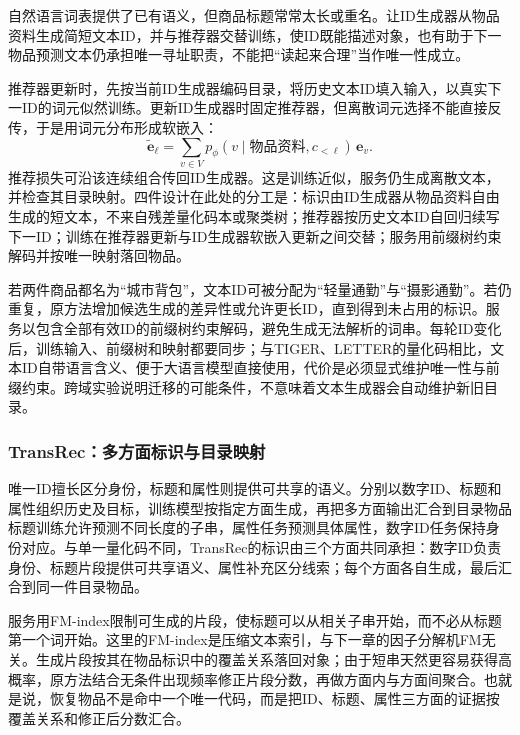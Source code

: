 自然语言词表提供了已有语义，但商品标题常常太长或重名。让ID生成器从物品资料生成简短文本ID，并与推荐器交替训练，使ID既能描述对象，也有助于下一物品预测文本仍承担唯一寻址职责，不能把“读起来合理”当作唯一性成立。

推荐器更新时，先按当前ID生成器编码目录，将历史文本ID填入输入，以真实下一ID的词元似然训练。更新ID生成器时固定推荐器，但离散词元选择不能直接反传，于是用词元分布形成软嵌入：
\begin{equation}
 \widetilde{\bm e}_\ell
 =\sum_{v\in V}p_\phi(v\mid\text{物品资料},c_{<\ell})\,\bm e_v.
 \label{eq:rs-idgenrec-soft}
\end{equation}
推荐损失可沿该连续组合传回ID生成器。这是训练近似，服务仍生成离散文本，并检查其目录映射。四件设计在此处的分工是：标识由ID生成器从物品资料自由生成的短文本，不来自残差量化码本或聚类树；推荐器按历史文本ID自回归续写下一ID；训练在推荐器更新与ID生成器软嵌入更新之间交替；服务用前缀树约束解码并按唯一映射落回物品。

若两件商品都名为“城市背包”，文本ID可被分配为“轻量通勤”与“摄影通勤”。若仍重复，原方法增加候选生成的差异性或允许更长ID，直到得到未占用的标识。服务以包含全部有效ID的前缀树约束解码，避免生成无法解析的词串。每轮ID变化后，训练输入、前缀树和映射都要同步；与TIGER、LETTER的量化码相比，文本ID自带语言含义、便于大语言模型直接使用，代价是必须显式维护唯一性与前缀约束。跨域实验说明迁移的可能条件，不意味着文本生成器会自动维护新旧目录。

\subsubsection{TransRec：多方面标识与目录映射}
\label{sec:rs-transrec}

唯一ID擅长区分身份，标题和属性则提供可共享的语义。分别以数字ID、标题和属性组织历史及目标，训练模型按指定方面生成，再把多方面输出汇合到目录物品标题训练允许预测不同长度的子串，属性任务预测具体属性，数字ID任务保持身份对应。与单一量化码不同，TransRec的标识由三个方面共同承担：数字ID负责身份、标题片段提供可共享语义、属性补充区分线索；每个方面各自生成，最后汇合到同一件目录物品。

服务用FM-index限制可生成的片段，使标题可以从相关子串开始，而不必从标题第一个词开始。这里的FM-index是压缩文本索引，与下一章的因子分解机FM无关。生成片段按其在物品标识中的覆盖关系落回对象；由于短串天然更容易获得高概率，原方法结合无条件出现频率修正片段分数，再做方面内与方面间聚合。也就是说，恢复物品不是命中一个唯一代码，而是把ID、标题、属性三方面的证据按覆盖关系和修正后分数汇合。

